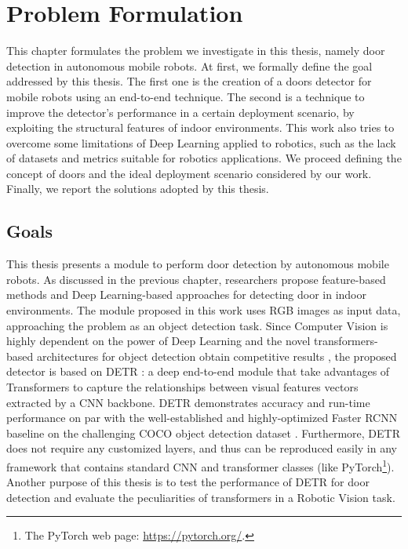 \chapter{Problem Formulation}
\label{sec:chapter3}
\thispagestyle{empty}

This chapter formulates the problem we investigate in this thesis, namely door detection in autonomous mobile robots.  At first, we formally define the goal addressed by this thesis. The first one is the creation of a doors detector for mobile robots using an end-to-end technique. The second is a technique to improve the detector's performance in a certain deployment scenario, by exploiting the structural features of indoor environments. This work also tries to overcome some limitations of Deep Learning applied to robotics, such as the lack of datasets and metrics suitable for robotics applications. We proceed defining the concept of doors and the ideal deployment scenario considered by our work. Finally, we report the solutions adopted by this thesis.

\section{Goals}
\label{sec:goals}
This thesis presents a module to perform door detection by autonomous mobile robots. As discussed in the previous chapter, researchers propose feature-based methods \cite{sonarandivisualdoordetection, humanoid, edgeandcornerdoorsdetector} and Deep Learning-based approaches \cite{detectdoorsfeature, doorsandnavigation, doorcabinet} for detecting door in indoor environments.  The module proposed in this work uses RGB images as input data, approaching the problem as an object detection task. Since Computer Vision is highly dependent on the power of Deep Learning \cite{deeplearningoverview} and the novel transformers-based architectures for object detection obtain competitive results \cite{surveytransformer}, the proposed detector is based on DETR \cite{detr}: a deep end-to-end module that take advantages of Transformers to capture the relationships between visual features vectors extracted by a CNN backbone. DETR demonstrates accuracy and run-time performance on par with the well-established and highly-optimized Faster RCNN \cite{fasterrcnn} baseline on the challenging COCO object detection dataset \cite{coco}. Furthermore, DETR does not require any customized layers, and thus can be reproduced easily in any framework that contains standard CNN and transformer classes (like PyTorch\footnote{The PyTorch web page: \url{https://pytorch.org/}.}). Another purpose of this thesis is to test the performance of DETR for door detection and evaluate the peculiarities of transformers in a Robotic Vision task.

